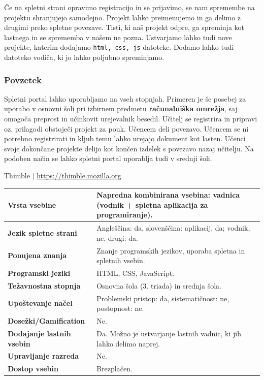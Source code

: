 Če na spletni strani opravimo registracijo in se prijavimo, se nam
 spremembe na projektu shranjujejo samodejno. Projekt lahko
 preimenujemo in ga delimo z drugimi preko spletne povezave. Tisti, ki
 naš projekt odpre, ga spreminja kot lastnega in se sprememba v našem
 ne pozna. Ustvarjamo lahko tudi nove projekte, katerim dodajamo
 \texttt{html, css, js} datoteke. Dodamo lahko tudi datoteko vodiča,
 ki jo lahko poljubno spreminjamo.
 
\subsubsection{Povzetek}
\label{sec:povzetek_thimble}

Spletni portal lahko uporabljamo na vseh stopnjah. Primeren je še
posebej za uporabo v osnovni šoli pri izbirnem predmetu
\textbf{računalniška omrežja}, saj omogoča preprost in učinkovit
urejevalnik besedil. Učitelj se registrira in pripravi oz. prilagodi
obstoječi projekt za pouk. Učencem deli povezavo. Učencem se ni
potrebno registrirati in kljub temu lahko urejajo dokument kot
lasten. Učenci svoje dokončane projekte delijo kot končen izdelek s
povezavo nazaj učitelju. Na podoben način se lahko spletni portal
uporablja tudi v srednji šoli.

\begin{osebnabox}[label={osebna:thimble}]{Thimble |
    \url{https://thimble.mozilla.org}}
    \begin{tabular}{
  p{} |
  p{}  }
  \textbf{Vrsta vsebine} & Napredna kombinirana vsebina: vadnica
                           (vodnik + spletna aplikacija za
                           programiranje).   \\
      \hline
  \textbf{Jezik spletne strani} & Angleščina: da, slovenščina:
                                  aplikacij, da; vodnik, ne. 
                                  drugi: da. \\
      \hline
  \textbf{Ponujena znanja} & Znanje programskih jezikov, uporaba
                             spletna in spletnih vsebin. \\
      \hline
 \textbf{Programski jeziki} & HTML, CSS, JavaScript. \\
      \hline
  \textbf{Težavnostna stopnja} & Osnovna šola (3. triada) in srednja
                                 šola. \\
      \hline
   \textbf{Upoštevanje načel} & Problemski pristop: da,
                                sistematičnost: ne, postopnost: ne. \\
      \hline
  \textbf{Dosežki/Gamification} & Ne. \\
      \hline
  \textbf{Dodajanje lastnih vsebin} & Da. Možno je ustvarjanje lastnih
                                      vadnic, ki jih lahko delimo
                                      naprej.  \\
      \hline
  \textbf{Upravljanje razreda} & Ne. \\
      \hline
  \textbf{Dostop vsebin} & Brezplačen. \\

\end{tabular}
\end{osebnabox}


